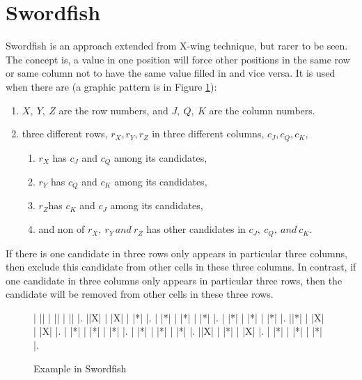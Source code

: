 \documentclass[11pt]{report}
\begin{document}
\section{Swordfish}
\label{sec:Swordfish}
Swordfish is an approach extended from X-wing technique, but rarer to be seen. The concept is, a value in one position will force other positions in the same row or same column not to have the same value filled in and vice versa. It is used when there are (a graphic pattern is in Figure \ref{fig:swordfish}):
\begin{enumerate}
\item $X,\ Y,\ Z$ are the row numbers, and $J,\ Q,\ K$ are the column numbers.
\item three different rows, $r_{X}, r_{Y}, r_{Z}$ in three different columns, $c_{J}, c_{Q}, c_{K}$,
\begin{enumerate}
\item $r_{X}$ has $c_{J}$ and $c_{Q}$ among its candidates,
\item $r_{Y}$ has $c_{Q}$ and $c_{K}$ among its candidates,
\item $r_{Z}$has $c_{K}$ and $c_{J}$ among its candidates,
\item and non of $r_{X},\ r_{Y}\, and\ r_{Z}$ has other candidates in $c_{J},\ c_{Q},\ and\ c_{K}.$
\end{enumerate}
\end{enumerate}
If there is one candidate in three rows only appears in particular three columns, then exclude this candidate from other cells in these three columns. In contrast, if one candidate in three columns only appears in particular three rows, then the candidate will be removed from other cells in these three rows.

\begin{figure}[htbp]
\begin{sudoku}
| |{}| | |{}| | |{}| |.
 |{}|X| | |X| | |*| |.
| |*| | |*| | |*| |.
| |*| | |*| | |*| |.
|{}|*| | |X| | |X| |.
| |*| | |*| | |*| |.
| |*| | |*| | |*| |.
|{}|X| | |*| | |X| |.
| |*| | |*| | |*| |.
\end{sudoku}
\caption{Example in Swordfish}
\label{fig:swordfish}
\end{figure}
\end{document}
